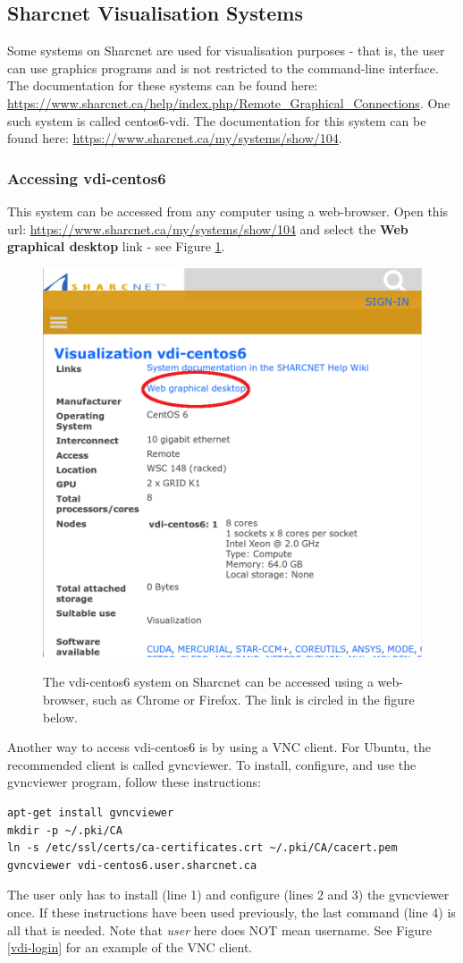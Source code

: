 \documentclass[12pt]{article}
\begin{document}
\subsection{Sharcnet Visualisation Systems}\label{visual}

\quad Some systems on Sharcnet are used for visualisation purposes - that is, the user can use graphics programs and is not restricted to the command-line interface. The documentation for these systems can be found here: \url{https://www.sharcnet.ca/help/index.php/Remote_Graphical_Connections}. One such system is called centos6-vdi. The documentation for this system can be found here: \url{https://www.sharcnet.ca/my/systems/show/104}. 

\subsubsection{Accessing vdi-centos6}

\quad This system can be accessed from any computer using a web-browser. Open this url: \url{https://www.sharcnet.ca/my/systems/show/104} and select the \textbf{Web graphical desktop} link - see Figure \ref{vdi-link}.

\begin{figure}[H]
\centering
\caption{The vdi-centos6 system on Sharcnet can be accessed using a web-browser, such as Chrome or Firefox. The link is circled in the figure below.}
\includegraphics[width=.7\textwidth]{vdi-link}
\label{vdi-link}
\end{figure}

\quad Another way to access vdi-centos6 is by using a VNC client. For Ubuntu, the recommended client is called gvncviewer. To install, configure, and use the gvncviewer program, follow these instructions: 
\begin{lstlisting}
apt-get install gvncviewer
mkdir -p ~/.pki/CA
ln -s /etc/ssl/certs/ca-certificates.crt ~/.pki/CA/cacert.pem
gvncviewer vdi-centos6.user.sharcnet.ca
\end{lstlisting}
The user only has to install (line 1) and configure (lines 2 and 3) the gvncviewer once. If these instructions have been used previously, the last command (line 4) is all that is needed. Note that \textit{user} here does NOT mean username. See Figure \ref{vdi-login} for an example of the VNC client.
\end{document}
